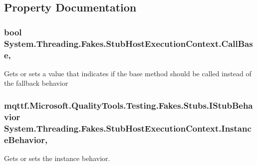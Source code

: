 \subsection{Property Documentation}
\hypertarget{class_system_1_1_threading_1_1_fakes_1_1_stub_host_execution_context_a85f94cd55cc53fc732d4918efb1a712a}{
\subsubsection[{Call\-Base}]{\setlength{\rightskip}{0pt plus 5cm}bool System.\-Threading.\-Fakes.\-Stub\-Host\-Execution\-Context.\-Call\-Base\hspace{0.3cm}{\ttfamily [get]}, {\ttfamily [set]}}}\label{class_system_1_1_threading_1_1_fakes_1_1_stub_host_execution_context_a85f94cd55cc53fc732d4918efb1a712a}


Gets or sets a value that indicates if the base method should be called instead of the fallback behavior

\hypertarget{class_system_1_1_threading_1_1_fakes_1_1_stub_host_execution_context_acc377becc917e178c57b3c96cb49ee3f}{
\subsubsection[{Instance\-Behavior}]{\setlength{\rightskip}{0pt plus 5cm}mqttf.\-Microsoft.\-Quality\-Tools.\-Testing.\-Fakes.\-Stubs.\-I\-Stub\-Behavior System.\-Threading.\-Fakes.\-Stub\-Host\-Execution\-Context.\-Instance\-Behavior\hspace{0.3cm}{\ttfamily [get]}, {\ttfamily [set]}}}\label{class_system_1_1_threading_1_1_fakes_1_1_stub_host_execution_context_acc377becc917e178c57b3c96cb49ee3f}


Gets or sets the instance behavior.

